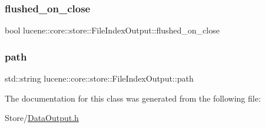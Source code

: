 \subsubsection{\texorpdfstring{flushed\+\_\+on\+\_\+close}{flushed\_on\_close}}
{\footnotesize\ttfamily bool lucene\+::core\+::store\+::\+File\+Index\+Output\+::flushed\+\_\+on\+\_\+close\hspace{0.3cm}{\ttfamily [private]}}

\mbox{\label{classlucene_1_1core_1_1store_1_1FileIndexOutput_a4a317430eb3ae95d997dfa94c99e4d96}} 
\subsubsection{\texorpdfstring{path}{path}}
{\footnotesize\ttfamily std\+::string lucene\+::core\+::store\+::\+File\+Index\+Output\+::path\hspace{0.3cm}{\ttfamily [private]}}



The documentation for this class was generated from the following file\+:\begin{DoxyCompactItemize}
\item 
Store/\mbox{\hyperlink{DataOutput_8h}{Data\+Output.\+h}}\end{DoxyCompactItemize}
